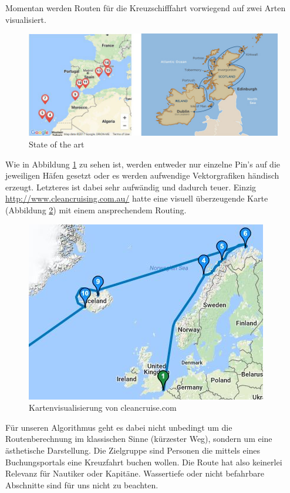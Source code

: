 \documentclass[letterpaper]{article}
\begin{document}
	Momentan werden Routen für die Kreuzschifffahrt vorwiegend auf zwei Arten visualisiert.

	\begin{figure}[!htb]
		\begin{center}
		\includegraphics[width=\linewidth]{state_of_the_art}
		\caption{State of the art}
		\label{fig:state of the art}
		\end{center}
	\end{figure}

	Wie in Abbildung \ref{fig:state of the art} zu sehen ist, werden entweder nur einzelne Pin's auf die jeweiligen Häfen gesetzt oder es werden aufwendige Vektorgrafiken händisch erzeugt. Letzteres ist dabei sehr aufwändig und dadurch teuer. Einzig \url{http://www.cleancruising.com.au/} hatte eine visuell überzeugende Karte (Abbildung \ref{fig:state of the art cleancruise}) mit einem ansprechendem Routing. 

	\begin{figure}[!htb]
		\begin{center}
		\includegraphics[width=.6\linewidth]{state_of_the_art_cleancruise}
		\caption{Kartenvisualisierung von cleancruise.com}
		\label{fig:state of the art cleancruise}
		\end{center}
	\end{figure}

	Für unseren Algorithmus geht es dabei nicht unbedingt um die Routenberechnung im klassischen Sinne (kürzester Weg), sondern um eine ästhetische Darstellung. Die Zielgruppe sind Personen die mittels eines Buchungsportals eine Kreuzfahrt buchen wollen. Die Route hat also keinerlei Relevanz für Nautiker oder Kapitäne. Wassertiefe oder nicht befahrbare Abschnitte sind für uns nicht zu beachten. 
\end{document}
